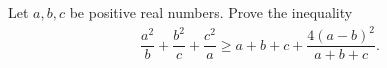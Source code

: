 Let $a,b,c$ be positive real numbers. Prove the inequality
\begin{align*}
\dfrac{a^2}{b}+\dfrac{b^2}{c}+\dfrac{c^2}{a}\geq a+b+c + \dfrac{4(a-b)^2}{a+b+c}.
\end{align*}